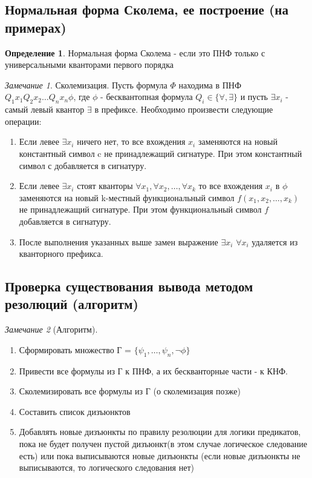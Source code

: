 \documentclass[a4paper]{article}
\theoremstyle{definition}
\newtheorem*{definition}{Определение}
\theoremstyle{remark}
\newtheorem*{remark}{Замечание}
\begin{document}
    \subsection{Нормальная форма Сколема, ее построение (на примерах)}
		\begin{definition}
			Нормальная форма Сколема - если это ПНФ только с универсальными кванторами первого порядка
		\end{definition}
		\begin{remark}
			Сколемизация. Пусть формула $\Phi$ находима в ПНФ $Q_1x_1 Q_2x_2 \dots Q_nx_n\phi$, где $\phi$ - бесквантопная формула $Q_i \in \{\forall, \exists\}$ и пусть $\exists x_i$ - самый левый квантор $\exists$ в префиксе. Необходимо произвести следующие операции:
			\begin{enumerate}
				\item Если левее $\exists x_i$ ничего нет, то все вхождения $x_i$ заменяются на новый константный символ c не принадлежащий сигнатуре. При этом константный символ с добавляется в сигнатуру.
				\item Если левее $\exists x_i$ стоят кванторы $\forall x_1, \forall x_2, \dots, \forall x_k$ то все вхождения $x_i$ в $\phi$ заменяются на новый k-местный функциональный символ $f(x_1, x_2, \dots, x_k)$ не принадлежащий сигнатуре. При этом функциональный символ $f$ добавляется в сигнатуру.
				\item После выполнения указанных выше замен выражение $\exists x_i$ $\forall x_i$ удаляется из кванторного префикса.
			\end{enumerate}
		\end{remark}
    \subsection{Проверка существования вывода методом резолюций (алгоритм)}
	\begin{remark}[Алгоритм]
		\begin{enumerate}
			\item Сформировать множество Г = $\{\psi_1, \dots, \psi_n, \neg \phi\}$
			\item Привести все формулы из Г к ПНФ, а их бескванторные части - к КНФ.
			\item Сколемизировать все формулы из Г (о сколемизация позже)
			\item Составить список дизъюнктов
			\item Добавлять новые дизъюнкты по правилу резолюции для логики предикатов, пока не будет получен пустой дизъюнкт(в этом случае логическое следование есть) или пока выписываются новые дизъюнкты (если новые дизъюнкты не выписываются, то логического следования нет)
		\end{enumerate}
	\end{remark}
\end{document}
